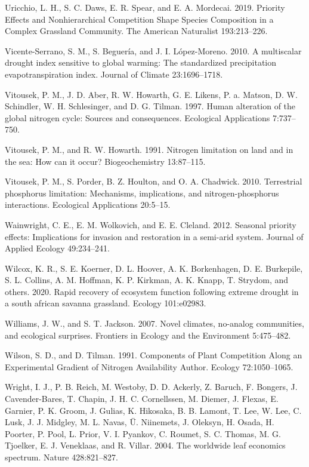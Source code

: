 \documentclass[twoside,12pt,final]{ucthesis-CA2012}
\begin{document}
\begin{ucmainmatter}
\leavevmode\hypertarget{ref-Uricchio2019}{}%
Uricchio, L. H., S. C. Daws, E. R. Spear, and E. A. Mordecai. 2019. Priority Effects and Nonhierarchical Competition Shape Species Composition in a Complex Grassland Community. The American Naturalist 193:213--226.

\leavevmode\hypertarget{ref-Vicente-Serrano2010}{}%
Vicente-Serrano, S. M., S. Beguería, and J. I. López-Moreno. 2010. A multiscalar drought index sensitive to global warming: The standardized precipitation evapotranspiration index. Journal of Climate 23:1696--1718.

\leavevmode\hypertarget{ref-Vitousek1997b}{}%
Vitousek, P. M., J. D. Aber, R. W. Howarth, G. E. Likens, P. a. Matson, D. W. Schindler, W. H. Schlesinger, and D. G. Tilman. 1997. Human alteration of the global nitrogen cycle: Sources and consequences. Ecological Applications 7:737--750.

\leavevmode\hypertarget{ref-Vitousek1991}{}%
Vitousek, P. M., and R. W. Howarth. 1991. Nitrogen limitation on land and in the sea: How can it occur? Biogeochemistry 13:87--115.

\leavevmode\hypertarget{ref-Vitousek2010}{}%
Vitousek, P. M., S. Porder, B. Z. Houlton, and O. A. Chadwick. 2010. Terrestrial phosphorus limitation: Mechanisms, implications, and nitrogen-phosphorus interactions. Ecological Applications 20:5--15.

\leavevmode\hypertarget{ref-Wainwright2012}{}%
Wainwright, C. E., E. M. Wolkovich, and E. E. Cleland. 2012. Seasonal priority effects: Implications for invasion and restoration in a semi-arid system. Journal of Applied Ecology 49:234--241.

\leavevmode\hypertarget{ref-Wilcox2020}{}%
Wilcox, K. R., S. E. Koerner, D. L. Hoover, A. K. Borkenhagen, D. E. Burkepile, S. L. Collins, A. M. Hoffman, K. P. Kirkman, A. K. Knapp, T. Strydom, and others. 2020. Rapid recovery of ecosystem function following extreme drought in a south african savanna grassland. Ecology 101:e02983.

\leavevmode\hypertarget{ref-Williams2007}{}%
Williams, J. W., and S. T. Jackson. 2007. Novel climates, no-analog communities, and ecological surprises. Frontiers in Ecology and the Environment 5:475--482.

\leavevmode\hypertarget{ref-Wilson1991}{}%
Wilson, S. D., and D. Tilman. 1991. Components of Plant Competition Along an Experimental Gradient of Nitrogen Availability Author. Ecology 72:1050--1065.

\leavevmode\hypertarget{ref-Wright2004}{}%
Wright, I. J., P. B. Reich, M. Westoby, D. D. Ackerly, Z. Baruch, F. Bongers, J. Cavender-Bares, T. Chapin, J. H. C. Cornellssen, M. Diemer, J. Flexas, E. Garnier, P. K. Groom, J. Gulias, K. Hikosaka, B. B. Lamont, T. Lee, W. Lee, C. Lusk, J. J. Midgley, M. L. Navas, Ü. Niinemets, J. Oleksyn, H. Osada, H. Poorter, P. Pool, L. Prior, V. I. Pyankov, C. Roumet, S. C. Thomas, M. G. Tjoelker, E. J. Veneklaas, and R. Villar. 2004. The worldwide leaf economics spectrum. Nature 428:821--827.


\end{ucmainmatter}
\end{document}
